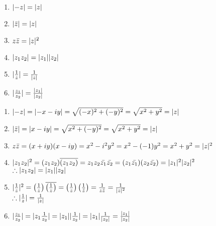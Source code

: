 \documentclass[letterpaper,12pt,fleqn]{article}
\newcommand{\conj}[1]{\bar{#1}}
\newcommand{\Conj}[1]{\overline{#1}}
\begin{document}
\begin{properties}
\listbreak
\begin{enumerate}
\item{$\lvert-z\rvert=\lvert z\rvert$}
\item{$\abs{\conj{z}}=\abs{z}$}
\item{$z\conj{z}=\abs{z}^2$}
\item{$\lvert z_1z_2\rvert=\lvert z_1\rvert\lvert z_2\rvert$}
\item{$\lvert\frac{1}{z}\rvert=\frac{1}{\lvert z\rvert}$}
\item{$\lvert\frac{z_1}{z_2}\rvert=\frac{\lvert z_1\rvert}{\lvert z_2\rvert}$}
\end{enumerate}
\end{properties}

\begin{theproof}
\listbreak
\begin{enumerate}
\item $\lvert-z\rvert=\lvert-x-iy\rvert=\sqrt{(-x)^2+(-y)^2}=\sqrt{x^2+y^2}=\lvert z\rvert$

\item $\abs{\conj{z}}=\abs{x-iy}=\sqrt{x^2+(-y)^2}=\sqrt{x^2+y^2}=\abs{z}$

\item $z\conj{z}=(x+iy)(x-iy)=x^2-i^2y^2=x^2-(-1)y^2=x^2+y^2=\abs{z}^2$

\item{$\abs{z_1z_2}^2=(z_1z_2)\Conj{(z_1z_2)}=z_1z_2\conj{z_1}\conj{z_2}=
    (z_1\conj{z_1})(z_2\conj{z_2})=\abs{z_1}^2\abs{z_2}^2$} \\
$\therefore \lvert z_1z_2\rvert=\lvert z_1\rvert\lvert z_2\rvert$

\item{$\abs{\frac{1}{z}}^2=
    \left(\frac{1}{z}\right)\Conj{\left(\frac{1}{z}\right)}=
    \left(\frac{1}{z}\right)\left(\frac{1}{\conj{z}}\right)=
    \frac{1}{z\conj{z}}=\frac{1}{\abs{z}^2}$} \\
$\therefore \lvert\frac{1}{z}\rvert=\frac{1}{\lvert z\rvert}$

\item{$\lvert\frac{z_1}{z_2}\rvert=\lvert z_1\frac{1}{z_2}\rvert=\lvert z_1\rvert\lvert\frac{1}{z_2}\rvert=
    \lvert z_1\rvert\frac{1}{\lvert z_2\rvert}=\frac{\lvert z_1\rvert}{\lvert z_2\rvert}$}
\end{enumerate}
\end{theproof}
\end{document}

